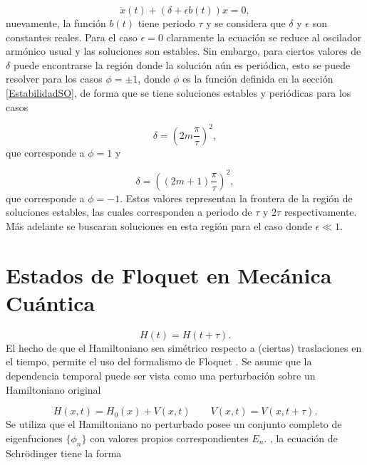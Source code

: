 \documentclass[10pt,a4paper]{report}
\begin{document}
\begin{equation}
\ddot{x}(t) + (\delta + \epsilon b(t))x = 0,
\end{equation} nuevamente, la función $b(t)$ tiene periodo $\tau$ y se considera que $\delta$ y $\epsilon$ son constantes reales. Para el caso $\epsilon = 0$ claramente la ecuación se reduce al oscilador armónico usual y las soluciones son estables. Sin embargo, para ciertos valores de $\delta$ puede encontrarse la región donde la solución aún es periódica, esto se puede resolver para los casos $\phi = \pm 1$, donde $\phi$ es la función definida en la sección \eqref{EstabilidadSO}, de forma que se tiene soluciones estables y periódicas para los casos

\begin{equation}
\delta = (2m\frac{\pi}{\tau})^2, 
\end{equation} que corresponde a $\phi=1$ y

\begin{equation}
\delta = ((2m+1)\frac{\pi}{\tau})^2,
\end{equation}
que corresponde a $\phi=-1$. Estos valores representan la frontera de
la región de soluciones estables, las cuales corresponden a periodo de
$\tau$ y $2\tau$ respectivamente. Más adelante se buscaran soluciones
en esta región para el caso donde $\epsilon \ll 1$.


\section{Estados de Floquet en Mecánica Cuántica}


\begin{equation}
H(t)=H(t+\tau).
\end{equation} El hecho de que el Hamiltoniano sea simétrico respecto a (ciertas) traslaciones en el tiempo, permite el uso del formalismo de Floquet \cite{HanngiDQS}. Se asume que la dependencia temporal puede ser vista como una perturbación sobre un Hamiltoniano original

\begin{equation}
H(x,t)=H_0(x)+V(x,t) \qquad V(x,t)=V(x,t+\tau).
\end{equation}
Se utiliza que el Hamiltoniano no perturbado posee un conjunto
completo de eigenfuciones $\{\phi_n\}$ con valores propios
correspondientes $E_n$. , la
ecuación de Schr\"{o}dinger tiene la forma
\end{document}
